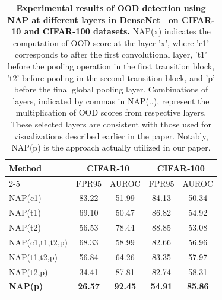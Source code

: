 \begin{table}[!t]
\footnotesize
\centering
\caption{\textbf{Experimental results of OOD detection using NAP at different layers in DenseNet~\cite{huang2017densely} on CIFAR-10 and CIFAR-100 datasets.} NAP(x) indicates the computation of OOD score at the layer 'x', where 'c1' corresponds to after the first convolutional layer, 't1' before the pooling operation in the first transition block, 't2' before pooling in the second transition block, and 'p' before the final global pooling layer. Combinations of layers, indicated by commas in NAP(..), represent the multiplication of OOD scores from respective layers. These selected layers are consistent with those used for visualizations described earlier in the paper. Notably, NAP(p) is the approach actually utilized in our paper.\\}
\label{tab:multi-layer}
\begin{tabular}{@{}lcc|cc@{}}
\toprule
\multirow{2}{*}{\textbf{Method}} & \multicolumn{2}{c|}{\textbf{CIFAR-10}} & \multicolumn{2}{c}{\textbf{CIFAR-100}} \\ \cmidrule{2-5} 
                                 & FPR95              & AUROC             & FPR95              & AUROC             \\ \midrule
NAP(c1)                          & 83.22              & 51.99             & 84.13              & 50.34             \\
NAP(t1)                          & 69.10              & 50.47             & 86.82              & 54.92             \\
NAP(t2)                          & 56.53              & 78.44             & 88.85              & 53.08             \\
NAP(c1,t1,t2,p)                  & 68.33              & 58.99             & 82.66              & 56.96             \\
NAP(t1,t2,p)                     & 56.84              & 64.26             & 83.35              & 57.97             \\
NAP(t2,p)                        & 34.41              & 87.81             & 82.74              & 58.31             \\
\textbf{NAP(p)}                  & \textbf{26.57}     & \textbf{92.45}    & \textbf{54.91}     & \textbf{85.86}    \\ \bottomrule
\end{tabular}
\end{table}

